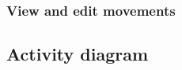 \subsubsection{View and edit movements}
\begin{figure}[!h]
	\centering
	\begin{minipage}[b]{0.75\textwidth}
	\end{minipage}
\end{figure}
\clearpage

\subsection{Activity diagram}
